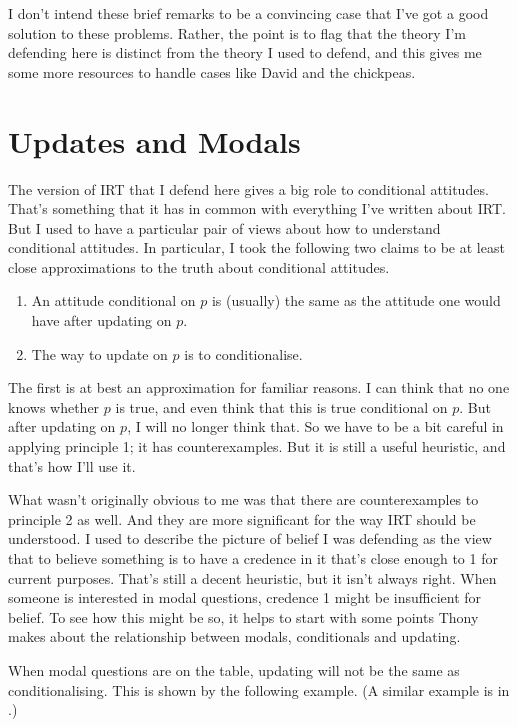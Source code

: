 \documentclass[11pt,]{book}
\providecommand{\tightlist}{%
  \setlength{\itemsep}{0pt}\setlength{\parskip}{0pt}}
\begin{document}
I don't intend these brief remarks to be a convincing case that I've got a good solution to these problems. Rather, the point is to flag that the theory I'm defending here is distinct from the theory I used to defend, and this gives me some more resources to handle cases like David and the chickpeas.

\hypertarget{modalupdate}{%
\section{Updates and Modals}\label{modalupdate}}

The version of IRT that I defend here gives a big role to conditional attitudes. That's something that it has in common with everything I've written about IRT. But I used to have a particular pair of views about how to understand conditional attitudes. In particular, I took the following two claims to be at least close approximations to the truth about conditional attitudes.

\begin{enumerate}
\def\labelenumi{\arabic{enumi}.}
\tightlist
\item
  An attitude conditional on \(p\) is (usually) the same as the attitude one would have after updating on \(p\).
\item
  The way to update on \(p\) is to conditionalise.
\end{enumerate}

The first is at best an approximation for familiar reasons. I can think that no one knows whether \(p\) is true, and even think that this is true conditional on \(p\). But after updating on \(p\), I will no longer think that. So we have to be a bit careful in applying principle 1; it has counterexamples. But it is still a useful heuristic, and that's how I'll use it.

What wasn't originally obvious to me was that there are counterexamples to principle 2 as well. And they are more significant for the way IRT should be understood. I used to describe the picture of belief I was defending as the view that to believe something is to have a credence in it that's close enough to 1 for current purposes. That's still a decent heuristic, but it isn't always right. When someone is interested in modal questions, credence 1 might be insufficient for belief. To see how this might be so, it helps to start with some points Thony \citet{Gillies2010} makes about the relationship between modals, conditionals and updating.

When modal questions are on the table, updating will not be the same as conditionalising. This is shown by the following example. (A similar example is in \citet[94]{Kratzer2012}.)
\end{document}

